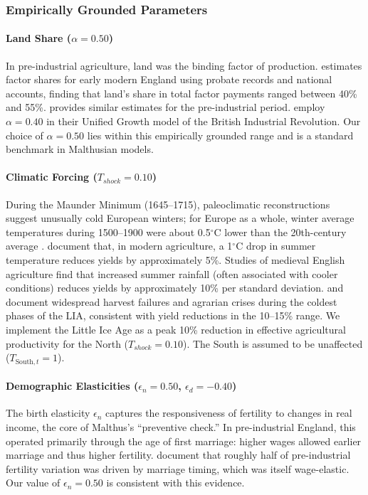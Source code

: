 \documentclass[11pt,a4paper]{article}
\begin{document}
\subsubsection*{Empirically Grounded Parameters}

\paragraph{Land Share (\(\alpha = 0.50\))}
In pre-industrial agriculture, land was the binding factor of production. \textcite{Allen2000} estimates factor shares for early modern England using probate records and national accounts, finding that land's share in total factor payments ranged between 40\% and 55\%. \textcite{Crafts1985} provides similar estimates for the pre-industrial period. \textcite{VoigtlanderVoth2006} employ \(\alpha = 0.40\) in their Unified Growth model of the British Industrial Revolution. Our choice of \(\alpha = 0.50\) lies within this empirically grounded range and is a standard benchmark in Malthusian models.

\paragraph{Climatic Forcing (\(T_{shock} = 0.10\))}
During the Maunder Minimum (1645--1715), paleoclimatic reconstructions suggest unusually cold European winters; for Europe as a whole, winter average temperatures during 1500--1900 were about 0.5\(^\circ\)C lower than the 20th-century average \parencite{Luterbacher2004, Mann2009}. \textcite{Schlenker2009} document that, in modern agriculture, a 1\(^\circ\)C drop in summer temperature reduces yields by approximately 5\%. Studies of medieval English agriculture find that increased summer rainfall (often associated with cooler conditions) reduces yields by approximately 10\% per standard deviation. \textcite{Parker2013} and \textcite{Campbell2016} document widespread harvest failures and agrarian crises during the coldest phases of the LIA, consistent with yield reductions in the 10--15\% range. We implement the Little Ice Age as a peak 10\% reduction in effective agricultural productivity for the North (\(T_{shock} = 0.10\)). The South is assumed to be unaffected (\(T_{\text{South},t}=1\)).

\paragraph{Demographic Elasticities (\(\epsilon_n = 0.50\), \(\epsilon_d = -0.40\))}
The birth elasticity \(\epsilon_n\) captures the responsiveness of fertility to changes in real income, the core of Malthus's ``preventive check.'' In pre-industrial England, this operated primarily through the age of first marriage: higher wages allowed earlier marriage and thus higher fertility. \textcite{WrigleySchofield1981} document that roughly half of pre-industrial fertility variation was driven by marriage timing, which was itself wage-elastic. Our value of \(\epsilon_n = 0.50\) is consistent with this evidence.
\end{document}
